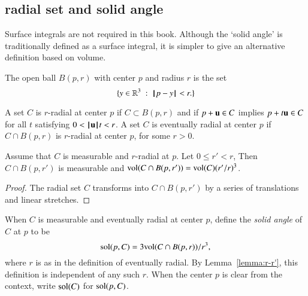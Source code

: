 \subsection{radial set and solid angle}\label{sec:solid}

Surface integrals are not required in this book.  Although
the `solid angle' is traditionally defined as a surface integral,
it is simpler to give an alternative definition based on volume.


\begin{definition}  The open ball $B(p,r)$ with center $p$ and
radius $r$ is the set
    $$
    \{ y\in\mathbb{R}^3 \ :\  {\hskip0.1em|\hskip-0.15em|\hskip0.1em}p - y{\hskip0.1em|\hskip-0.15em|\hskip0.1em} < r.\}
    $$
%
%
\end{definition}



\begin{definition}[radial]
    A set $C$ is $r$-radial at center $p$ if  $C\subset B(p,r)$
    and if
        $p + {\mathbf u} \in C$ implies
        $p + t {\mathbf u} \in C$ for all $t$ satisfying $0 < {{\hskip0.1em|\hskip-0.15em|\hskip0.1em}{\mathbf u}{\hskip0.1em|\hskip-0.15em|\hskip0.1em}} t < r$.
A set $C$ is eventually radial at center $p$ if $C\cap B(p,r)$ is
$r$-radial at center $p$, for some $r>0$.
%
\end{definition}
%

\begin{lemma}
Assume that $C$ is measurable and $r$-radial at $p$.  Let $0\le r'<r$,
Then $C\cap B(p,r')$ is measurable and
${\operatorname{vol}}(C\cap B(p,r')) = {\operatorname{vol}}(C) (r'/r)^3$.
\end{lemma}

\begin{proof}  The radial set $C$ transforms into $C\cap B(p,r')$ by
a series of translations and linear stretches.
\end{proof}


\begin{definition}
When $C$ is measurable and eventually radial at center $p$, 
define the {\it solid angle} of $C$ at $p$ to be
    $$
    {\operatorname{sol}}(p,C) = 3 {\operatorname{vol}}(C\cap B(p,r))/r^3,
    $$
where $r$ is as in the definition of eventually radial. 
By Lemma~\ref{lemma:r-r'}, this
definition is independent of any such $r$.  When the center $p$ is
clear from the context, write ${\operatorname{sol}}(C)$ for
${\operatorname{sol}}(p,C)$.
%
%
\end{definition}




